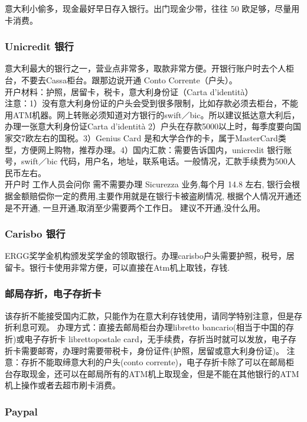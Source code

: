 意大利小偷多，现金最好早日存入银行。出门现金少带，往往 50 欧足够，尽量用卡消费。

\subsubsection{Unicredit 银行}

意大利最大的银行之一，营业点非常多，取款非常方便。开银行账户时去个人柜台，不要去Cassa柜台。跟那边说开通 Conto Corrente（户头）。\\
开户材料：护照，居留卡，税卡，意大利身份证（Carta d’identità）\\
注意：1）没有意大利身份证的户头会受到很多限制，比如存款必须去柜台，不能用ATM机器。网上转账必须知道对方银行的swift／bic。所以建议抵达意大利后，办理一张意大利身份证Carta d’identità 2）户头在存款5000以上时，每季度要向国家交7欧左右的国税。3）Genius Card 是和大学合作的卡，属于MasterCard类型，方便网上购物，推荐办理。4）国内汇款：需要告诉国内，unicredit 银行账号，swift／bic 代码，用户名，地址，联系电话。一般情况，汇款手续费为500人民币左右。\\
开户时 工作人员会问你 需不需要办理 Sicurezza 业务,每个月 14.8 左右, 银行会根据金额赔偿你一定的费用,主要作用就是在银行卡被盗刷情况, 根据个人情况开通还是不开通, 一旦开通,取消至少需要两个工作日。 建议不开通,没什么用。

\subsubsection{Carisbo 银行}
ERGG奖学金机构颁发奖学金的领取银行。办理carisbo户头需要护照，税号，居留卡。银行卡使用非常方便，可以直接在Atm机上取钱，存钱.

\subsubsection{邮局存折，电子存折卡}

该存折不能接受国内汇款，只能作为在意大利存钱使用，请同学特别注意，但是存折利息可观。
办理方式：直接去邮局柜台办理libretto bancario(相当于中国的存折)或电子存折卡 librettopostale card，无手续费，存折当时就可以发放，电子存折卡需要邮寄，办理时需要带税卡，身份证件(护照，居留或意大利身份证)。
注意：存折不能取缔意大利的户头(conto corrente)，电子存折卡除了可以在邮局柜台存取现金，还可以在邮局所有的ATM机上取现金，但是不能在其他银行的ATM机上操作或者去超市刷卡消费。

\subsubsection{Paypal}

